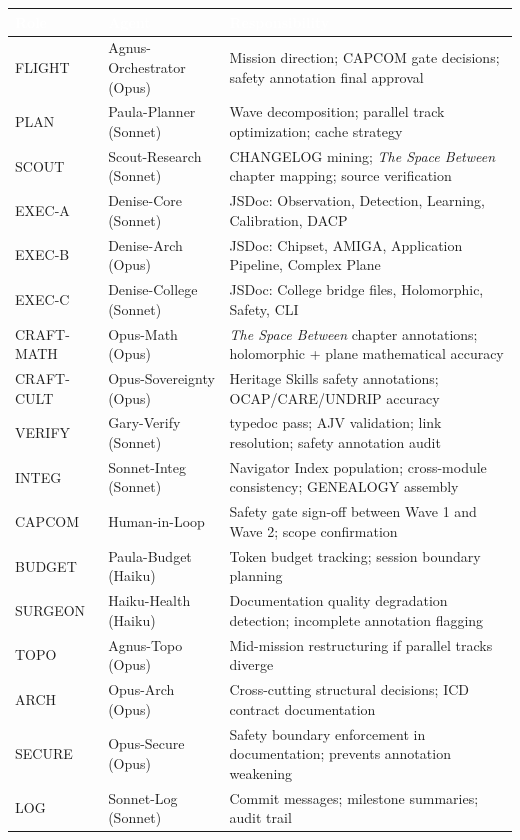\documentclass[11pt,letterpaper]{article}
\newcommand{\tableheader}[1]{\textbf{\sffamily\textcolor{white}{#1}}}
\begin{document}
\begin{center}
\begin{tabularx}{\textwidth}{L{2cm}L{3.5cm}X}
\toprule
{}
\tableheader{Role} & \tableheader{Agent} & \tableheader{Responsibility} \\
\midrule
FLIGHT & Agnus-Orchestrator (Opus) & Mission direction; CAPCOM gate decisions; safety annotation final approval \\
PLAN & Paula-Planner (Sonnet) & Wave decomposition; parallel track optimization; cache strategy \\
SCOUT & Scout-Research (Sonnet) & CHANGELOG mining; \textit{The Space Between} chapter mapping; source verification \\
EXEC-A & Denise-Core (Sonnet) & JSDoc: Observation, Detection, Learning, Calibration, DACP \\
EXEC-B & Denise-Arch (Opus) & JSDoc: Chipset, AMIGA, Application Pipeline, Complex Plane \\
EXEC-C & Denise-College (Sonnet) & JSDoc: College bridge files, Holomorphic, Safety, CLI \\
CRAFT-MATH & Opus-Math (Opus) & \textit{The Space Between} chapter annotations; holomorphic + plane mathematical accuracy \\
CRAFT-CULT & Opus-Sovereignty (Opus) & Heritage Skills safety annotations; OCAP/CARE/UNDRIP accuracy \\
VERIFY & Gary-Verify (Sonnet) & typedoc pass; AJV validation; link resolution; safety annotation audit \\
INTEG & Sonnet-Integ (Sonnet) & Navigator Index population; cross-module consistency; GENEALOGY assembly \\
CAPCOM & Human-in-Loop & Safety gate sign-off between Wave 1 and Wave 2; scope confirmation \\
BUDGET & Paula-Budget (Haiku) & Token budget tracking; session boundary planning \\
SURGEON & Haiku-Health (Haiku) & Documentation quality degradation detection; incomplete annotation flagging \\
TOPO & Agnus-Topo (Opus) & Mid-mission restructuring if parallel tracks diverge \\
ARCH & Opus-Arch (Opus) & Cross-cutting structural decisions; ICD contract documentation \\
SECURE & Opus-Secure (Opus) & Safety boundary enforcement in documentation; prevents annotation weakening \\
LOG & Sonnet-Log (Sonnet) & Commit messages; milestone summaries; audit trail \\
\bottomrule
\end{tabularx}
\end{center}
\end{document}
